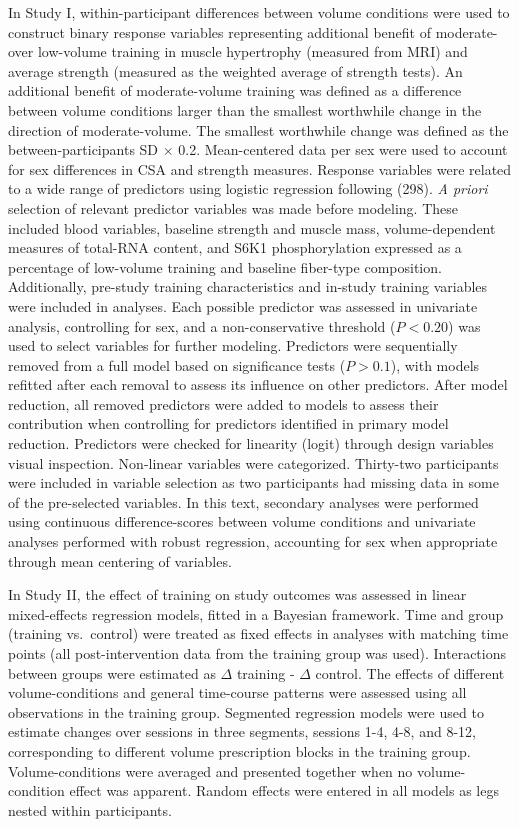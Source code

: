 \documentclass[twoside,10pt]{gihclass} %
\begin{document}
In Study I, within-participant differences between volume conditions were used to construct binary response variables representing additional benefit of moderate- over low-volume training in muscle hypertrophy (measured from MRI) and average strength (measured as the weighted average of strength tests). An additional benefit of moderate-volume training was defined as a difference between volume conditions larger than the smallest worthwhile change in the direction of moderate-volume. The smallest worthwhile change was defined as the between-participants SD \(\times\) 0.2. Mean-centered data per sex were used to account for sex differences in CSA and strength measures.
Response variables were related to a wide range of predictors using logistic regression following (298). \emph{A priori} selection of relevant predictor variables was made before modeling. These included blood variables, baseline strength and muscle mass, volume-dependent measures of total-RNA content, and S6K1 phosphorylation expressed as a percentage of low-volume training and baseline fiber-type composition. Additionally, pre-study training characteristics and in-study training variables were included in analyses.
Each possible predictor was assessed in univariate analysis, controlling for sex, and a non-conservative threshold (\(P < 0.20\)) was used to select variables for further modeling.
Predictors were sequentially removed from a full model based on significance tests (\(P > 0.1\)), with models refitted after each removal to assess its influence on other predictors. After model reduction, all removed predictors were added to models to assess their contribution when controlling for predictors identified in primary model reduction. Predictors were checked for linearity (logit) through design variables visual inspection. Non-linear variables were categorized. Thirty-two participants were included in variable selection as two participants had missing data in some of the pre-selected variables.
In this text, secondary analyses were performed using continuous difference-scores between volume conditions and univariate analyses performed with robust regression, accounting for sex when appropriate through mean centering of variables.

In Study II, the effect of training on study outcomes was assessed in linear mixed-effects regression models, fitted in a Bayesian framework.
Time and group (training vs.~control) were treated as fixed effects in analyses with matching time points (all post-intervention data from the training group was used).
Interactions between groups were estimated as \(\Delta\) training - \(\Delta\) control.
The effects of different volume-conditions and general time-course patterns were assessed using all observations in the training group.
Segmented regression models were used to estimate changes over sessions in three segments, sessions 1-4, 4-8, and 8-12, corresponding to different volume prescription blocks in the training group.
Volume-conditions were averaged and presented together when no volume-condition effect was apparent.
Random effects were entered in all models as legs nested within participants.
\end{document}
